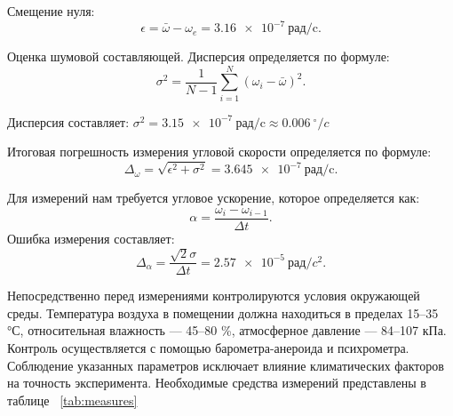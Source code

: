 Смещение нуля:
\begin{equation}
	\epsilon
	= \bar{\omega} - \omega_e = \SI{3,16 e-7}{\text{рад/c}}.
	\label{eq:omega_correct}
\end{equation}

Оценка шумовой составляющей. Дисперсия определяется по формуле:
\begin{equation}
	\sigma^2=\frac{1}{N-1}\sum_{i=1}^N(\omega_i-\bar{\omega})^2.
	\label{eq:disperssion}
\end{equation}

Дисперсия составляет: $\sigma^2=\SI{3,15 e-7}{\text{рад/c}} \approx \SI{0,006}{^\circ /c}$

Итоговая погрешность измерения угловой скорости определяется по формуле:
\begin{equation}
	\Delta_{\omega}=\sqrt{\epsilon^2+\sigma^2}=\SI{3,645 e-7}{\text{рад/c}}.
	\label{eq:rmse}
\end{equation}

Для измерений нам требуется угловое ускорение, которое определяется как:
\begin{equation}
	\alpha =\frac{\omega_i-\omega_{i-1}}{\Delta t}.
	\label{eq:acc}
\end{equation}
Ошибка измерения составляет:
\begin{equation}
	\Delta_\alpha = \frac{\sqrt{2}\sigma}{\Delta t} = \SI{2,57 e-5}{\text{рад}/c^2}.
	\label{eq:rmse_a}
\end{equation}







Непосредственно перед измерениями контролируются условия окружающей среды. Температура воздуха в помещении должна находиться в пределах 15–35 °С, относительная влажность — 45–80 \%, атмосферное давление — 84–107 кПа. Контроль осуществляется с помощью барометра-анероида и психрометра. Соблюдение указанных параметров исключает влияние климатических факторов на точность эксперимента. Необходимые средства измерений представлены в таблице ~\cref{tab:measures}

\begingroup
\small
\captionsetup[table]{skip=7pt}

